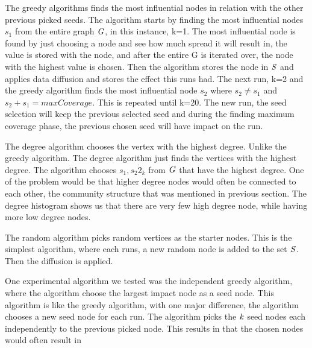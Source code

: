 The greedy algorithms finds the most influential nodes in relation with the other previous picked seeds. The algorithm starts by finding the most influential nodes $s_1$ from the entire graph $\it{G}$, in this instance, k=1. The most influential node is found by just choosing a node and see how much spread it will result in, the value is stored with the node, and after the entire G is iterated over, the node with the highest value is chosen. Then the algorithm stores the node in $\it{S}$ and applies data diffusion and stores the effect this runs had. The next run, k=2 and the greedy algorithm finds the most influential node $s_2$ where $s_2 \neq s_1$ and $s_2 +s_1 = maxCoverage$. This is repeated until k=20. The new run, the seed selection will keep the previous selected seed and during the finding maximum coverage phase, the previous chosen seed will have impact on the run.

The degree algorithm chooses the vertex with the highest degree. Unlike the greedy algorithm. The degree algorithm just finds the vertices with the highest degree. The algorithm chooses $s_1, s_2 \dot 2_k$ from $\it{G}$ that have the highest degree. One of the problem would be that higher degree nodes would often be connected to each other, the community structure that was mentioned in previous section. The degree histogram shows us that there are very few high degree node, while having more low degree nodes.

The random algorithm picks random vertices as the starter nodes. This is the simplest algorithm, where each runs, a new random node is added to the set $\it{S}$. Then the diffusion is applied. 

One experimental algorithm we tested was the independent greedy algorithm, where the algorithm choose the largest impact node as a seed node. This algorithm is like the greedy algorithm, with one major difference, the algorithm chooses a new seed node for each run. The algorithm picks the $\it{k}$ seed nodes each independently to the previous picked node. This results in that the chosen nodes would often result in  

